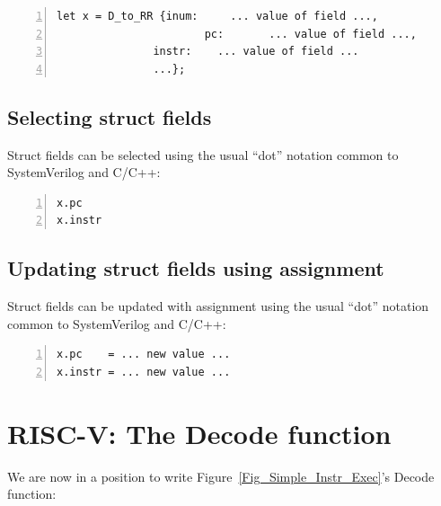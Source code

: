 \begin{Verbatim}[frame=single, numbers=left]
      let x = D_to_RR {inum:     ... value of field ...,
                       pc:       ... value of field ...,
		       instr:    ... value of field ...
		       ...};
\end{Verbatim}


\subsection{Selecting struct fields}


Struct fields can be selected using the usual ``dot'' notation common
to SystemVerilog and C/C++:

\begin{Verbatim}[frame=single, numbers=left]
x.pc
x.instr
\end{Verbatim}



\subsection{Updating struct fields using assignment}


Struct fields can be updated with assignment using the usual ``dot''
notation common to SystemVerilog and C/C++:

\begin{Verbatim}[frame=single, numbers=left]
x.pc    = ... new value ...
x.instr = ... new value ...
\end{Verbatim}


\section{RISC-V: The Decode function}

\label{Sec_Combo_Decode}


We are now in a position to write Figure~\ref{Fig_Simple_Instr_Exec}'s Decode function:

